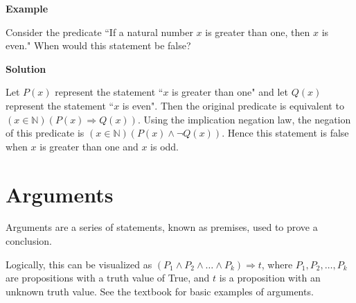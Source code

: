 \documentclass{article}
\begin{document}
    \vspace{1.5mm}
    \textbf{Example}
    
    Consider the predicate ``If a natural number $x$ is greater than one, then $x$ is even." When would this statement be false?
    
    \vspace{1.5mm}
    \textbf{Solution}
    
    Let $P(x)$ represent the statement ``$x$ is greater than one" and let $Q(x)$ represent the statement ``$x$ is even". Then the original predicate is equivalent to $(x \in \mathbb{N})(P(x) \Rightarrow Q(x))$. Using the implication negation law, the negation of this predicate is $(x \in \mathbb{N})(P(x) \land \neg Q(x))$. Hence this statement is false when $x$ is greater than one and $x$ is odd.
        
\section*{Arguments}
    Arguments are a series of statements, known as premises, used to prove a conclusion.
    
    \vspace{1.5mm}
    Logically, this can be visualized as $(P_{1} \land P_{2} \land \dots \land P_{k}) \Rightarrow t$, where $P_{1}, P_{2}, \dots, P_{k}$ are propositions with a truth value of True, and $t$ is a proposition with an unknown truth value. See the textbook for basic examples of arguments.
\end{document}
